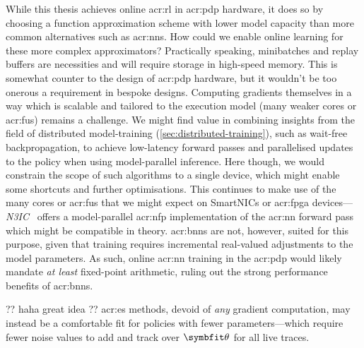 
While this thesis achieves online \gls{acr:rl} in \gls{acr:pdp} hardware, it does so by choosing a function approximation scheme with lower model capacity than more common alternatives such as \glspl{acr:nn}.
How could we enable online learning for these more complex approximators?
Practically speaking, minibatches and replay buffers are necessities and will require storage in high-speed memory.
This is somewhat counter to the design of \gls{acr:pdp} hardware, but it wouldn't be too onerous a requirement in bespoke designs.
Computing gradients themselves in a way which is scalable and tailored to the execution model (many weaker cores or \glspl{acr:fu}) remains a challenge.
We might find value in combining insights from the field of distributed model-training (\cref{sec:distributed-training}), such as wait-free backpropagation, to achieve low-latency forward passes and parallelised updates to the policy when using model-parallel inference.
Here though, we would constrain the scope of such algorithms to a single device, which might enable some shortcuts and further optimisations.
This continues to make use of the many cores or \glspl{acr:fu} that we might expect on SmartNICs or \gls{acr:fpga} devices---\emph{N3IC}~\parencite{DBLP:journals/corr/abs-2009-02353} offers a model-parallel \gls{acr:nfp} implementation of the \gls{acr:nn} forward pass which might be compatible in theory.
\glspl{acr:bnn} are not, however, suited for this purpose, given that training requires incremental real-valued adjustments to the model parameters.
As such, online \gls{acr:nn} training in the \gls{acr:pdp} would likely mandate \emph{at least} fixed-point arithmetic, ruling out the strong performance benefits of \glspl{acr:bnn}.

?? haha great idea
?? \gls{acr:es} methods, devoid of \emph{any} gradient computation, may instead be a comfortable fit for policies with fewer parameters---which require fewer noise values to add and track over $\wvec{}$ for all live traces.

